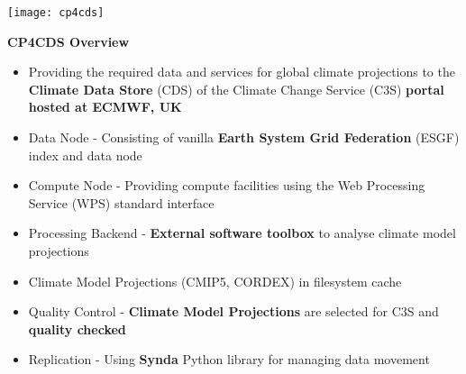 \documentclass[landscape,a0paper,fontscale=0.4]{baposter} %
\newcommand{\compresslist}{%
\setlength{\itemsep}{1pt}%
\setlength{\parskip}{0pt}%
\setlength{\parsep}{0pt}%
}
\begin{document}
\begin{poster}
{   %


   \begin{minipage}{0.4\textwidth}
     \texttt{[image: cp4cds]}
   \end{minipage}
   \begin{minipage}{0.6\textwidth}
     {\bf CP4CDS Overview}
     \begin{itemize}\compresslist
       \item Providing the required data and services for global climate projections
        to the {\bf Climate Data Store} (CDS) of the
        Climate Change Service (C3S) {\bf portal hosted at ECMWF, UK}
       \item Data Node - Consisting of vanilla {\bf Earth System Grid Federation} (ESGF) index and data node
       \item Compute Node - Providing compute facilities using the Web Processing Service (WPS) standard interface
       \item Processing Backend - {\bf External software toolbox} to analyse climate model projections
       \item Climate Model Projections (CMIP5, CORDEX) in filesystem cache
       \item Quality Control - {\bf Climate Model Projections} are selected for C3S and {\bf quality checked}
       \item Replication - Using {\bf Synda} Python library for managing data movement
     \end{itemize}
  \end{minipage}

}
\end{poster}
\end{document}
